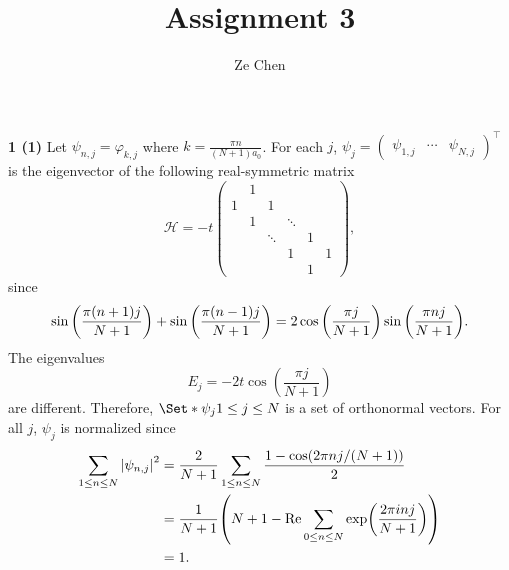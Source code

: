 \documentclass{article}
\title{Assignment 3}
\author{Ze Chen}
\makeatletter
\newcommand*{\shifttext}[1]{%
  \settowidth{\@tempdima}{#1}%
  \hspace{-\@tempdima}#1%
}
\newcommand{\plabel}[1]{%
\shifttext{\textbf{#1}\quad}%
}
\makeatother
\begin{document}
\maketitle

\plabel{1 (1)}%
Let $\psi_{n,j} = \varphi_{k,j}$ where $\displaystyle k = \frac{\pi n }{(N+1) a_0}$.
For each $j$, $\psi_j = \begin{pmatrix}
  \psi_{1,j} & \cdots & \psi_{N,j}
\end{pmatrix}^\intercal$ is the eigenvector of the following real-symmetric matrix
\[ \mathcal{H} = -t \begin{pmatrix}
    & 1 &   &   &   &   \\
  1 &   & 1 &   &   &   \\
    & 1 &   & \ddots &   &   \\
    &   &  \ddots &   & 1 &   \\
    &   &   & 1 &   & 1 \\
    &   &   &   & 1 &   
\end{pmatrix}, \]
since
\[ \sin \qty(\frac{\pi (n+1) j}{N+1}) + \sin \qty(\frac{\pi (n-1)j}{N+1}) = 2 \cos\qty(\frac{\pi j}{N+1}) \sin \qty(\frac{\pi n j}{N+1}). \]
The eigenvalues
\[ E_j = -2t \cos(\frac{\pi j}{N+1}) \]
are different.
Therefore, $\Set*{\psi_j}{1\le j\le N}$ is a set of orthonormal vectors.
For all $j$, $\psi_j$ is normalized since
\begin{align*}
  \sum_{1\le n\le N} \abs{\psi_{n,j}}^2 &= \frac{2}{N+1} \sum_{1\le n \le N} \frac{1 - \cos(2\pi n j/(N+1))}{2} \\
  &= \frac{1}{N+1} \qty(N + 1 - \Re \sum_{0\le n \le N}  \exp(\frac{2\pi i n j}{N+1})) \\
  &= 1.
\end{align*}
\end{document}
